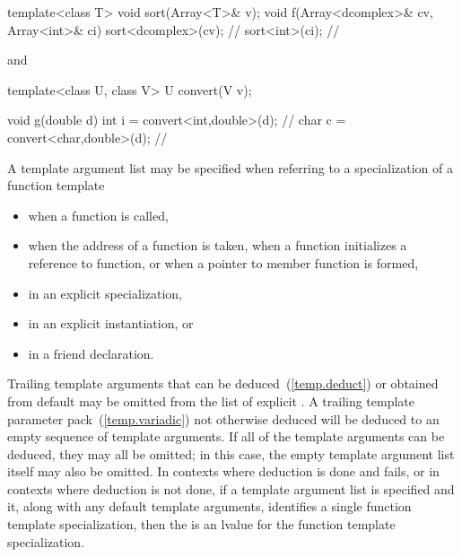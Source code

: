 \begin{codeblock}
template<class T> void sort(Array<T>& v);
void f(Array<dcomplex>& cv, Array<int>& ci) {
  sort<dcomplex>(cv);           // 
  sort<int>(ci);                // 
}
\end{codeblock}

and

\begin{codeblock}
template<class U, class V> U convert(V v);

void g(double d) {
  int i = convert<int,double>(d);       // 
  char c = convert<char,double>(d);     // 
}
\end{codeblock}
\exitexample

\pnum
A template argument list may be specified when referring to a specialization
of a function template

\begin{itemize}
\item
when a function is called,
\item
when the address of a function is taken, when a function initializes a
reference to function, or when a pointer to member function is formed,
\item
in an explicit specialization,
\item
in an explicit instantiation, or
\item
in a friend declaration.
\end{itemize}

\pnum
Trailing template arguments that can be deduced~(\ref{temp.deduct}) or
obtained from default
may be omitted from the list of explicit
.
A trailing template parameter pack~(\ref{temp.variadic}) not otherwise deduced will be
deduced to an empty sequence of template arguments.
If all of the template arguments can be deduced, they may all be omitted;
in this case, the empty template argument list
\tcode{<>}
itself may also be omitted.
In contexts where deduction is done and fails, or in contexts where
deduction is not done, if a template argument list is specified and it,
along with any default template arguments, identifies a single function
template specialization, then the
is an lvalue for the function template specialization.
\enterexample

